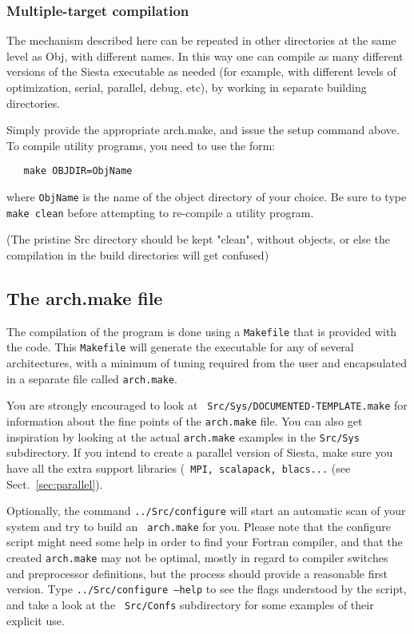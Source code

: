 \documentclass[11pt]{article}
\begin{document}
\subsubsection{Multiple-target compilation}

The mechanism described here can be repeated in other directories at
the same level as Obj, with different names. In this way one can
compile as many different versions of the {\sc Siesta} executable as
needed (for example, with different levels of optimization, serial,
parallel, debug, etc), by working in separate building directories.

Simply provide the appropriate arch.make, and issue the setup command
above. To compile utility programs, you need to use the form:

\begin{verbatim}
   make OBJDIR=ObjName
\end{verbatim}

where {\tt ObjName} is the name of the object directory of your
choice. Be sure to type {\tt make clean} before attempting to
re-compile a utility program.

(The pristine Src directory should be kept "clean", without objects, or else
the compilation in the build directories will get confused)


\subsection{The arch.make file}
\label{sec:arch-make}

The compilation of the program is done using a {\tt Makefile} that is
provided with the code. This {\tt Makefile} will
generate the executable for any of several architectures, with a
minimum of tuning required from the user and encapsulated in a
separate file called {\tt arch.make}.

You are strongly encouraged to look at {\tt
  Src/Sys/DOCUMENTED-TEMPLATE.make} for information about the fine
points of the {\tt arch.make} file. You can also get inspiration by
looking at the actual {\tt arch.make} examples in the {\tt Src/Sys}
subdirectory. If you intend to create a parallel version of {\sc
  Siesta}, make sure you have all the extra support libraries ({\tt
  MPI, scalapack, blacs...} (see Sect.~\ref{sec:parallel}).
  
Optionally, the command {\tt ../Src/configure} will
start an automatic scan of your system and try to build an {\tt
  arch.make} for you. Please note that the configure script might need
some help in order to find your Fortran compiler, and that the created
{\tt arch.make} may not be optimal, mostly in regard to compiler
switches and preprocessor definitions, but the process should provide
a reasonable first version. Type {\tt ../Src/configure --help} to see
the flags understood by the script, and take a look at the {\tt
  Src/Confs} subdirectory for some examples of their explicit use.
\end{document}
